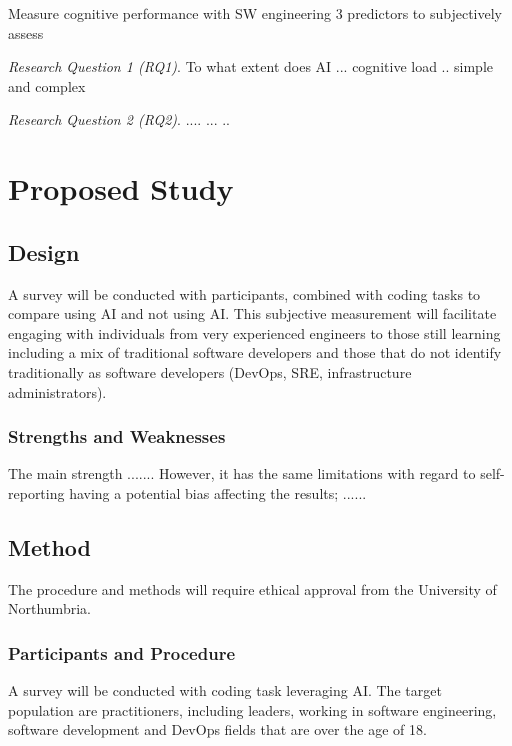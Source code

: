 \documentclass[man]{apa7}
\begin{document}
Measure cognitive performance with SW engineering
3 predictors to subjectively assess

\emph{Research Question 1 (RQ1)}. To what extent does AI  ... cognitive load  .. simple and complex

\emph{Research Question 2 (RQ2)}. .... ... ..  


\section{Proposed Study}
\subsection{Design}

A survey will be conducted with participants, combined with coding tasks to compare using AI and not using AI. This subjective measurement will facilitate engaging with individuals from very experienced engineers to those still learning including a mix of traditional software developers and those that do not identify traditionally as software developers (DevOps, SRE, infrastructure administrators).

\subsubsection{Strengths and Weaknesses}
The main strength ....... However, it has the same limitations with regard to self-reporting having a potential bias affecting the results;  ......

\subsection{Method}
The procedure and methods will require ethical approval from the University of Northumbria.

\subsubsection{Participants and Procedure}
A survey will be conducted with coding task leveraging AI. The target population are practitioners, including leaders, working in software engineering, software development and DevOps fields that are over the age of 18. 
 
\end{document}
